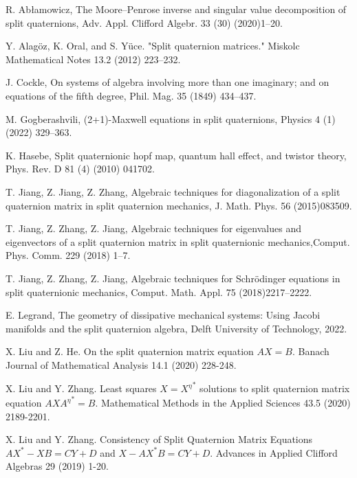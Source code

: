 \documentclass[3p]{elsarticle}
\numberwithin{equation}{section}
\begin{document}
\begin{thebibliography}{99}


 R. Abłamowicz, The Moore–Penrose inverse and singular value decomposition of split quaternions, Adv. Appl. Clifford Algebr. 33 (30) (2020)1–20.

 Y. Alag\"oz, K. Oral, and S. Y\"uce. "Split quaternion matrices." Miskolc Mathematical Notes 13.2 (2012) 223–232.


 J. Cockle, On systems of algebra involving more than one imaginary; and on equations of the fifth degree, Phil. Mag. 35 (1849) 434–437.

 M. Gogberashvili, (2+1)-Maxwell equations in split quaternions, Physics 4 (1) (2022) 329–363.

 K. Hasebe, Split quaternionic hopf map, quantum hall effect, and twistor theory, Phys. Rev. D 81 (4) (2010) 041702.

 T. Jiang, Z. Jiang, Z. Zhang, Algebraic techniques for diagonalization of a split quaternion matrix in split quaternion mechanics, J. Math. Phys. 56 (2015)083509.

T. Jiang, Z. Zhang, Z. Jiang, Algebraic techniques for eigenvalues and eigenvectors of a split quaternion matrix in split quaternionic mechanics,Comput. Phys. Comm. 229 (2018) 1–7.

T. Jiang, Z. Zhang, Z. Jiang, Algebraic techniques for Schrödinger equations in split quaternionic mechanics, Comput. Math. Appl. 75 (2018)2217–2222.

 E. Legrand, The geometry of dissipative mechanical systems: Using Jacobi manifolds and the split quaternion algebra, Delft University of
Technology, 2022.

 X. Liu and Z. He. On the split quaternion matrix equation $AX= B$. Banach Journal of Mathematical Analysis 14.1 (2020) 228-248.

 X. Liu and Y. Zhang. Least squares \(X = {X^{\eta}}^* \) solutions to split quaternion matrix equation \(AX{A^{\eta}}^*= B\). Mathematical Methods in the Applied Sciences 43.5 (2020) 2189-2201.

 X. Liu and Y. Zhang. Consistency of Split Quaternion Matrix Equations $AX^* - XB = CY + D$ and $X - AX^*B = CY + D$. Advances in Applied Clifford Algebras 29 (2019) 1-20.


\end{thebibliography}
\end{document}
